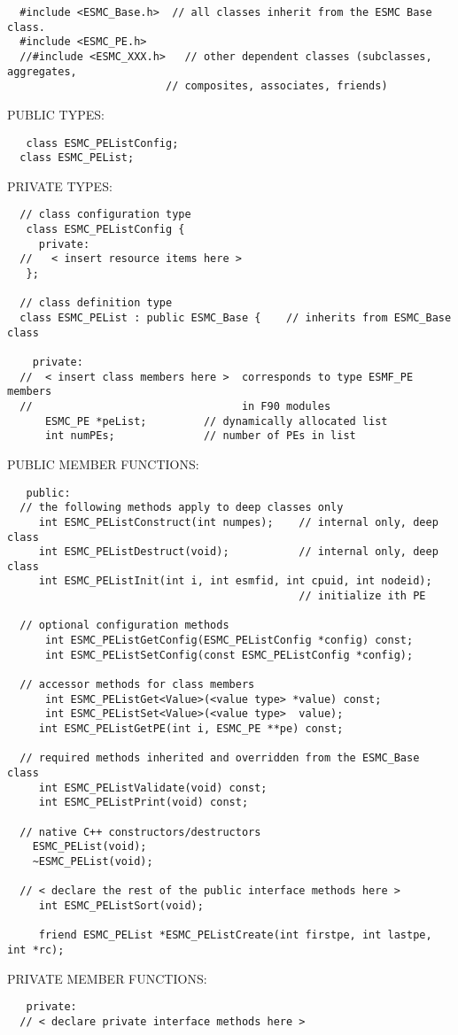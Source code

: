 \begin{verbatim}  #include <ESMC_Base.h>  // all classes inherit from the ESMC Base class.
  #include <ESMC_PE.h>
  //#include <ESMC_XXX.h>   // other dependent classes (subclasses, aggregates,
                         // composites, associates, friends)
 \end{verbatim}{\sf PUBLIC TYPES:}
\begin{verbatim}   class ESMC_PEListConfig;
  class ESMC_PEList;
 \end{verbatim}{\sf PRIVATE TYPES:}
\begin{verbatim} 
  // class configuration type
   class ESMC_PEListConfig {
     private:
  //   < insert resource items here >
   };
 
  // class definition type
  class ESMC_PEList : public ESMC_Base {    // inherits from ESMC_Base class
 
    private:
  //  < insert class members here >  corresponds to type ESMF_PE members
  //                                 in F90 modules
      ESMC_PE *peList;         // dynamically allocated list
      int numPEs;              // number of PEs in list
 \end{verbatim}{\sf PUBLIC MEMBER FUNCTIONS:}
\begin{verbatim}   public:
  // the following methods apply to deep classes only
     int ESMC_PEListConstruct(int numpes);    // internal only, deep class
     int ESMC_PEListDestruct(void);           // internal only, deep class
     int ESMC_PEListInit(int i, int esmfid, int cpuid, int nodeid);
                                              // initialize ith PE
 
  // optional configuration methods
      int ESMC_PEListGetConfig(ESMC_PEListConfig *config) const;
      int ESMC_PEListSetConfig(const ESMC_PEListConfig *config);
 
  // accessor methods for class members
      int ESMC_PEListGet<Value>(<value type> *value) const;
      int ESMC_PEListSet<Value>(<value type>  value);
     int ESMC_PEListGetPE(int i, ESMC_PE **pe) const;
     
  // required methods inherited and overridden from the ESMC_Base class
     int ESMC_PEListValidate(void) const;
     int ESMC_PEListPrint(void) const;
 
  // native C++ constructors/destructors
 	ESMC_PEList(void);
 	~ESMC_PEList(void);
   
  // < declare the rest of the public interface methods here >
     int ESMC_PEListSort(void);
 
     friend ESMC_PEList *ESMC_PEListCreate(int firstpe, int lastpe, int *rc);
   \end{verbatim}{\sf PRIVATE MEMBER FUNCTIONS:}
\begin{verbatim}   private: 
  // < declare private interface methods here >\end{verbatim}


